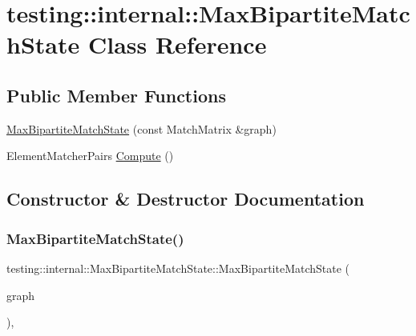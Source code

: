 \hypertarget{classtesting_1_1internal_1_1MaxBipartiteMatchState}{}\section{testing\+::internal\+::Max\+Bipartite\+Match\+State Class Reference}
\label{classtesting_1_1internal_1_1MaxBipartiteMatchState}
\subsection*{Public Member Functions}
\begin{DoxyCompactItemize}
\item 
\mbox{\hyperlink{classtesting_1_1internal_1_1MaxBipartiteMatchState_a9d0166d5cc7afd1b741f6c312df72b54}{Max\+Bipartite\+Match\+State}} (const Match\+Matrix \&graph)
\item 
Element\+Matcher\+Pairs \mbox{\hyperlink{classtesting_1_1internal_1_1MaxBipartiteMatchState_af6efab664ee390925b24d023f1368192}{Compute}} ()
\end{DoxyCompactItemize}


\subsection{Constructor \& Destructor Documentation}
\mbox{\label{classtesting_1_1internal_1_1MaxBipartiteMatchState_a9d0166d5cc7afd1b741f6c312df72b54}} 
\subsubsection{\texorpdfstring{MaxBipartiteMatchState()}{MaxBipartiteMatchState()}}
{\footnotesize\ttfamily testing\+::internal\+::\+Max\+Bipartite\+Match\+State\+::\+Max\+Bipartite\+Match\+State (\begin{DoxyParamCaption}\item[{const Match\+Matrix \&}]{graph }\end{DoxyParamCaption})\hspace{0.3cm}{\ttfamily [inline]}, {\ttfamily [explicit]}}



